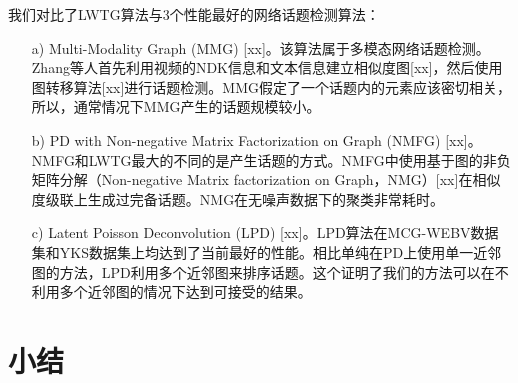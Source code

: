 我们对比了LWTG算法与3个性能最好的网络话题检测算法：
\begin{enumerate}
  \item[a)] Multi-Modality Graph (MMG) [xx]。该算法属于多模态网络话题检测。Zhang等人首先利用视频的NDK信息和文本信息建立相似度图[xx]，然后使用图转移算法[xx]进行话题检测。MMG假定了一个话题内的元素应该密切相关，所以，通常情况下MMG产生的话题规模较小。
  \item[b)] PD with Non-negative Matrix Factorization on Graph
(NMFG) [xx]。NMFG和LWTG最大的不同的是产生话题的方式。NMFG中使用基于图的非负矩阵分解（Non-negative Matrix factorization on Graph，NMG）[xx]在相似度级联上生成过完备话题。NMG在无噪声数据下的聚类非常耗时。
  \item[c)] Latent Poisson Deconvolution (LPD) [xx]。LPD算法在MCG-WEBV数据集和YKS数据集上均达到了当前最好的性能。相比单纯在PD上使用单一近邻图的方法，LPD利用多个近邻图来排序话题。这个证明了我们的方法可以在不利用多个近邻图的情况下达到可接受的结果。
\end{enumerate}

\section{小结}

